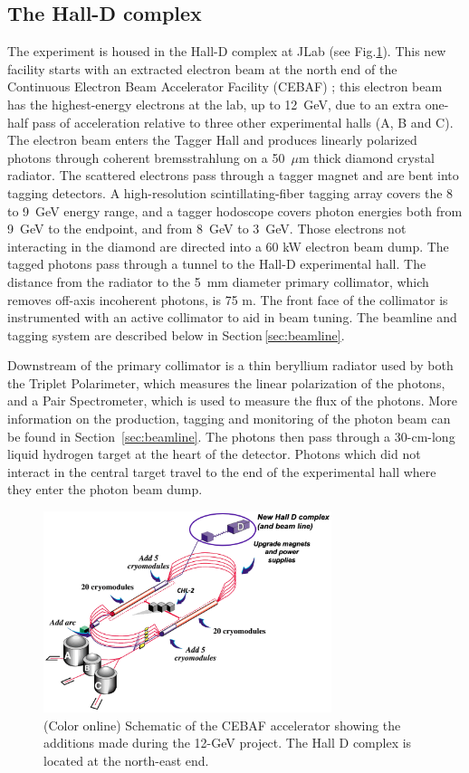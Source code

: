 \subsection[The Hall-D complex]{The Hall-D complex \label{sec:gluexexperiment:complex}}
The \gx{} experiment is housed in the Hall-D complex at JLab (see Fig.\ref{fig:CEBAF-graphic}). This new facility starts with an extracted electron beam at the north end of the Continuous Electron Beam Accelerator Facility (CEBAF) \cite{Leemann:2001dg}; this electron beam has the highest-energy electrons at the lab, up to 12~GeV, due to an extra one-half pass of acceleration relative to three other experimental halls (A, B and C). The electron beam enters the Tagger Hall and produces linearly polarized photons through coherent bremsstrahlung on a 50~$\mu$m thick diamond crystal radiator.
The scattered electrons pass through a tagger magnet and are bent into tagging detectors. A high-resolution scintillating-fiber tagging array covers the 8 to 9~GeV energy range, and a tagger hodoscope covers photon energies both from 9~GeV to the endpoint, and from 8~GeV to 3~GeV. Those electrons not interacting in the diamond are directed into a 60 kW electron beam dump. The tagged photons pass through a tunnel to the Hall-D experimental hall. The distance from the radiator to the 5~mm diameter primary collimator, which removes off-axis incoherent photons, is 75 m. The front face of the collimator is instrumented with an active collimator to aid in beam tuning.  The beamline and tagging system are described below in Section\,\ref{sec:beamline}.

Downstream of the primary collimator is a thin beryllium radiator used by both the Triplet Polarimeter, which measures the linear polarization of the photons, and a Pair Spectrometer, which is used to measure the flux of the photons. More information on the production, tagging and monitoring of the photon beam can be found in Section~\ref{sec:beamline}. The photons then pass through a 30-cm-long liquid hydrogen target at the heart of the \gx{} detector. Photons which did not interact in the central target travel to the end of the experimental hall where they enter the photon beam dump.

\begin{figure}[tbp]\centering
\includegraphics[width=0.75\textwidth]{figures/CEBAF-graphic.png}
\caption[]{\label{fig:CEBAF-graphic}(Color online) Schematic of the CEBAF accelerator showing the additions made during the 12-GeV project. The Hall D complex is located at the north-east end.}
\end{figure}


